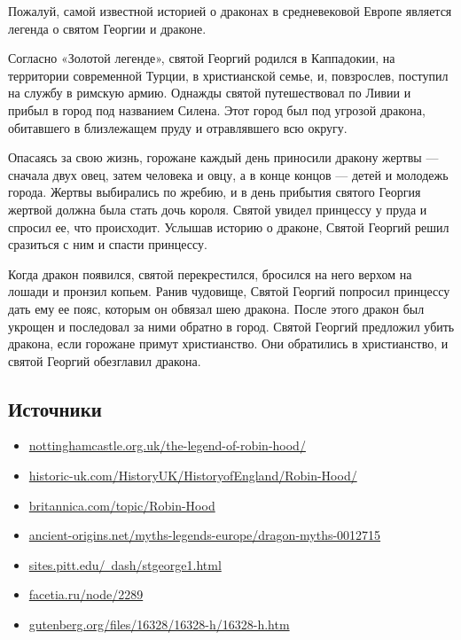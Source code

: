 Пожалуй, самой известной историей о драконах в средневековой Европе
является легенда о святом Георгии и драконе.

Согласно «Золотой легенде», святой Георгий родился в Каппадокии, на территории
современной Турции, в христианской семье, и, повзрослев, поступил на службу в
римскую армию. Однажды святой путешествовал по Ливии и прибыл в город под названием
Силена. Этот город был под угрозой дракона, обитавшего в близлежащем пруду и
отравлявшего всю округу.

Опасаясь за свою жизнь, горожане каждый день приносили дракону жертвы — сначала двух
овец, затем человека и овцу, а в конце концов — детей и молодежь города. Жертвы
выбирались по жребию, и в день прибытия святого Георгия жертвой должна была стать
дочь короля. Святой увидел принцессу у пруда и спросил ее, что происходит. Услышав
историю о драконе, Святой Георгий решил сразиться с ним и спасти принцессу.

Когда дракон появился, святой перекрестился, бросился на него верхом на лошади и
пронзил копьем. Ранив чудовище, Святой Георгий попросил принцессу дать ему ее пояс,
которым он обвязал шею дракона. После этого дракон был укрощен и последовал за ними
обратно в город. Святой Георгий предложил убить дракона, если горожане примут
христианство. Они обратились в христианство, и святой Георгий обезглавил дракона.

\newpage

\subsection*{Источники}

\begin{itemize}
    \item \href{https://www.nottinghamcastle.org.uk/the-legend-of-robin-hood/}{nottinghamcastle.org.uk/the-legend-of-robin-hood/} \\
    \item \href{https://www.historic-uk.com/HistoryUK/HistoryofEngland/Robin-Hood/}{historic-uk.com/HistoryUK/HistoryofEngland/Robin-Hood/} \\
    \item \href{https://www.britannica.com/topic/Robin-Hood}{britannica.com/topic/Robin-Hood} \\
    \item \href{https://www.ancient-origins.net/myths-legends-europe/dragon-myths-0012715}{ancient-origins.net/myths-legends-europe/dragon-myths-0012715} \\
    \item \href{https://sites.pitt.edu/~dash/stgeorge1.html}{sites.pitt.edu/~dash/stgeorge1.html}
    \item \href{https://facetia.ru/node/2289}{facetia.ru/node/2289} \\
\item \href{https://www.gutenberg.org/files/16328/16328-h/16328-h.htm}{gutenberg.org/files/16328/16328-h/16328-h.htm} \\
\end{itemize}


